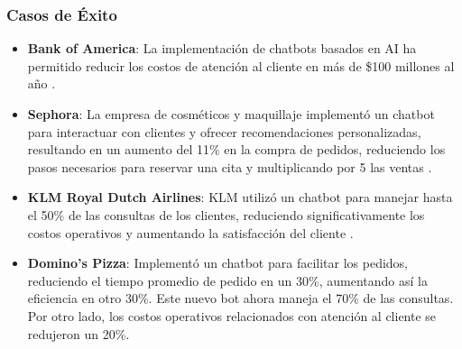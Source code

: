 \subsubsection{Casos de Éxito}
\begin{itemize}
    \item \textbf{Bank of America}: La implementación de chatbots basados en AI ha permitido reducir los costos de atención al cliente en más de \$100 millones al año \cite{bofa2020chatbots}.
    \item \textbf{Sephora}: La empresa de cosméticos y maquillaje implementó un chatbot para interactuar con clientes y ofrecer recomendaciones personalizadas, resultando en un aumento del 11\% en la compra de pedidos, reduciendo los pasos necesarios para reservar una cita y multiplicando por 5 las ventas \cite{sephora2020chatbot}.
    \item \textbf{KLM Royal Dutch Airlines}: KLM utilizó un chatbot para manejar hasta el 50\% de las consultas de los clientes, reduciendo significativamente los costos operativos y aumentando la satisfacción del cliente \cite{klm2020chatbot}.
    \item \textbf{Domino's Pizza}: Implementó un chatbot para facilitar los pedidos, reduciendo el tiempo promedio de pedido en un 30\%, aumentando así la eficiencia en otro 30\%. Este nuevo bot ahora maneja el 70\% de las consultas. Por otro lado, los costos operativos relacionados con atención al cliente se redujeron un 20\%\cite{dominos2020chatbot}.
\end{itemize}




